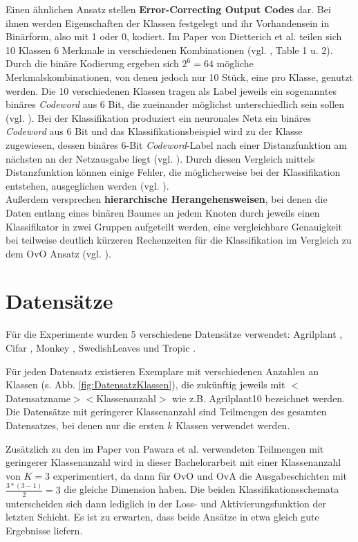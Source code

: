Einen ähnlichen Ansatz stellen \textbf{Error-Correcting Output Codes} \cite{errorCorrectingCodes} dar. Bei ihnen werden Eigenschaften der Klassen festgelegt und ihr Vorhandensein in Binärform, also mit 1 oder 0, kodiert. Im Paper von Dietterich et al. \cite{errorCorrectingCodes} teilen sich 10 Klassen 6 Merkmale in verschiedenen Kombinationen (vgl. \cite{errorCorrectingCodes}, Table 1 u. 2). Durch die binäre Kodierung ergeben sich $2^6 = 64$ mögliche Merkmalskombinationen, von denen jedoch nur 10 Stück, eine pro Klasse, genutzt werden. Die 10 verschiedenen Klassen tragen als Label jeweils ein sogenanntes binäres \textit{Codeword} aus 6 Bit, die zueinander möglichst unterschiedlich sein sollen (vgl. \cite{errorCorrectingCodes}). Bei der Klassifikation produziert ein neuronales Netz ein binäres \textit{Codeword} aus 6 Bit und das Klassifikationsbeispiel wird zu der Klasse zugewiesen, dessen binäres 6-Bit \textit{Codeword}-Label nach einer Distanzfunktion am nächsten an der Netzausgabe liegt (vgl. \cite{errorCorrectingCodes}). Durch diesen Vergleich mittels Distanzfunktion können einige Fehler, die möglicherweise bei der Klassifikation entstehen, ausgeglichen werden (vgl. \cite{errorCorrectingCodes}).\\


Außerdem versprechen \textbf{hierarchische Herangehensweisen}, bei denen die Daten entlang eines binären Baumes an jedem Knoten durch jeweils einen Klassifikator in zwei Gruppen aufgeteilt werden, eine vergleichbare Genauigkeit bei teilweise deutlich kürzeren Rechenzeiten für die Klassifikation im Vergleich zu dem OvO Ansatz (vgl. \cite{hierarchischeMethoden}).
\newpage
\section{Datensätze}
\label{ch:methodik_datensaetze}
Für die Experimente wurden 5 verschiedene Datensätze verwendet: Agrilplant \cite{pawaraWebsiteDatensaetze}, Cifar \cite{cifar10}, Monkey \cite{pawaraWebsiteDatensaetze}, SwedishLeaves \cite{swedishLeaves} und Tropic \cite{pawaraWebsiteDatensaetze}.

Für jeden Datensatz existieren Exemplare mit verschiedenen Anzahlen an Klassen (s. Abb. \ref{fig:DatensatzKlassen}), die zukünftig jeweils mit $<$Datensatzname$><$Klassenanzahl$>$ wie z.B. Agrilplant10 bezeichnet werden.
Die Datensätze mit geringerer Klassenanzahl sind Teilmengen des gesamten Datensatzes, bei denen nur die ersten $k$ Klassen verwendet werden.

Zusätzlich zu den im Paper von Pawara et al. \cite{pawaraPaper} verwendeten Teilmengen mit geringerer Klassenanzahl wird in dieser Bachelorarbeit mit einer Klassenanzahl von $K=3$ experimentiert, da dann für OvO und OvA die Ausgabeschichten mit $\frac{3*(3-1)}{2} = 3$ die gleiche Dimension haben. Die beiden Klassifikationsschemata unterscheiden sich dann lediglich in der Loss- und Aktivierungsfunktion der letzten Schicht. Es ist zu erwarten, dass beide Ansätze in etwa gleich gute Ergebnisse liefern.

